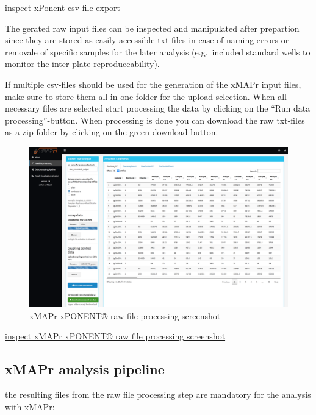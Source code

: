 \documentclass[
]{book}
\begin{document}
\href{figures/xMAPr_analysis_workflow.png}{inspect xPonent csv-file export}

The gerated raw input files can be inspected and manipulated after prepartion since they are stored as easily accessible txt-files in case of naming errors or removale of specific samples for the later analysis (e.g.~included standard wells to monitor the inter-plate reproduceability).

If multiple csv-files should be used for the generation of the xMAPr input files, make sure to store them all in one folder for the upload selection. When all necessary files are selected start processing the data by clicking on the ``Run data processing''-button. When processing is done you can download the raw txt-files as a zip-folder by clicking on the green download button.

\begin{figure}

{\centering \includegraphics[width=50.58in]{figures/xPONENT_raw_file_processing} 

}

\caption{xMAPr xPONENT® raw file  processing screenshot}\label{fig:xMAPrxPONENT}
\end{figure}

\href{figures/xPONENT_raw_file_processing.png}{inspect xMAPr xPONENT® raw file processing screenshot}

\hypertarget{xmapr-analysis-pipeline}{%
\subsection{xMAPr analysis pipeline}\label{xmapr-analysis-pipeline}}

the resulting files from the raw file processing step are mandatory for the analysis with xMAPr:
\end{document}
